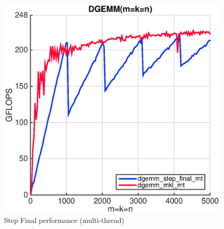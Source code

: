 \begin{figure}[!htp]
  \centering
  \includegraphics[scale=.5]{figures/step_final_multi_thread_ivy.eps}
  \caption{Step Final performance (multi-thread)}
  \label{fig:final_mt}
\end{figure} 







